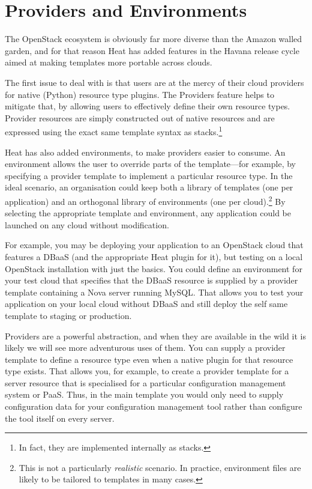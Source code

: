 \section{Providers and Environments}

The OpenStack ecosystem is obviously far more diverse than the Amazon walled garden, and for that reason Heat has added features in the Havana release cycle aimed at making templates more portable across clouds.

The first issue to deal with is that users are at the mercy of their cloud providers for native (Python) resource type plugins. The Providers feature helps to mitigate that, by allowing users to effectively define their own resource types. Provider resources are simply constructed out of native resources and are expressed using the exact same template syntax as stacks.\footnote{In fact, they are implemented internally as stacks.}

Heat has also added environments, to make providers easier to consume. An environment allows the user to override parts of the template---for example, by specifying a provider template to implement a particular resource type. In the ideal scenario, an organisation could keep both a library of templates (one per application) and an orthogonal library of environments (one per cloud).\footnote{This is not a particularly \emph{realistic} scenario. In practice, environment files are likely to be tailored to templates in many cases.} By selecting the appropriate template and environment, any application could be launched on any cloud without modification.

For example, you may be deploying your application to an OpenStack cloud that features a DBaaS (and the appropriate Heat plugin for it), but testing on a local OpenStack installation with just the basics. You could define an environment for your test cloud that specifies that the DBaaS resource is supplied by a provider template containing a Nova server running MySQL. That allows you to test your application on your local cloud without DBaaS and still deploy the self same template to staging or production.

Providers are a powerful abstraction, and when they are available in the wild it is likely we will see more adventurous uses of them. You can supply a provider template to define a resource type even when a native plugin for that resource type exists. That allows you, for example, to create a provider template for a server resource that is specialised for a particular configuration management system or PaaS. Thus, in the main template you would only need to supply configuration data for your configuration management tool rather than configure the tool itself on every server.
